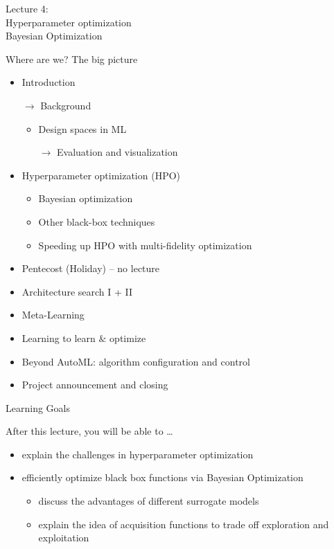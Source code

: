 \begin{frame}[c]{}

\centering
\huge
Lecture 4:\\
Hyperparameter optimization\\
Bayesian Optimization
\end{frame}
\begin{frame}[c]{Where are we? The big picture}

\begin{itemize}
	\item Introduction
	\item[$\to$] Background
	\begin{itemize}
		\item Design spaces in ML
		\item[$\to$] Evaluation and visualization
	\end{itemize}
	\item Hyperparameter optimization (HPO)
	\begin{itemize}
		\item Bayesian optimization
		\item Other black-box techniques
		\item Speeding up HPO with multi-fidelity optimization
	\end{itemize}
	\item Pentecost (Holiday) -- no lecture
	\item Architecture search I + II
	\item Meta-Learning
	\item Learning to learn $\&$ optimize
	\item Beyond AutoML: algorithm configuration and control
	\item Project announcement and closing
\end{itemize}

\end{frame}

\begin{frame}[c]{Learning Goals}

After this lecture, you will be able to \ldots

\begin{itemize}
  \item explain the \alert{challenges in hyperparameter optimization}
  \item efficiently optimize black box functions via \alert{Bayesian Optimization}
  \begin{itemize}
    \item discuss the advantages of different \alert{surrogate models}
    \item explain the idea of \alert{acquisition functions} to trade off exploration and exploitation
  \end{itemize}
\end{itemize}


\end{frame}
